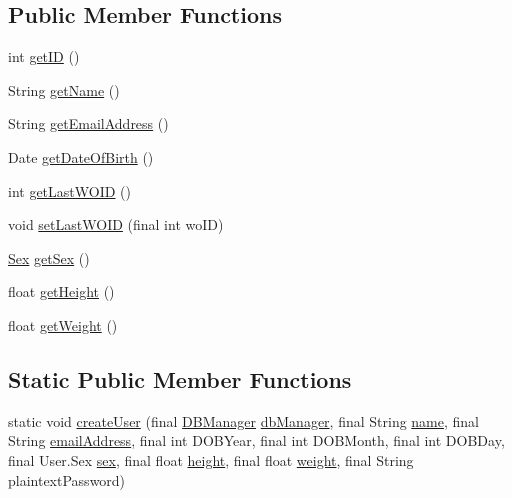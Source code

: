 \subsection*{Public Member Functions}
\begin{DoxyCompactItemize}
\item 
int \mbox{\hyperlink{classcom_1_1activitytracker_1_1_user_a967ae64a7818e9e532ad6d361650d8e6}{get\+ID}} ()
\item 
String \mbox{\hyperlink{classcom_1_1activitytracker_1_1_user_a6b39e49a1e49279035fd61a667d14f64}{get\+Name}} ()
\item 
String \mbox{\hyperlink{classcom_1_1activitytracker_1_1_user_a79d69ca90216e0552ac4cae9778ea40d}{get\+Email\+Address}} ()
\item 
Date \mbox{\hyperlink{classcom_1_1activitytracker_1_1_user_a40da04454cea10bb5c6e6125a7a9cf64}{get\+Date\+Of\+Birth}} ()
\item 
int \mbox{\hyperlink{classcom_1_1activitytracker_1_1_user_a6180e6d835c4b1613f976ed04d68e50e}{get\+Last\+W\+O\+ID}} ()
\item 
void \mbox{\hyperlink{classcom_1_1activitytracker_1_1_user_aae20422e5870c5ba771fb15a5cc6414f}{set\+Last\+W\+O\+ID}} (final int wo\+ID)
\item 
\mbox{\hyperlink{enumcom_1_1activitytracker_1_1_user_1_1_sex}{Sex}} \mbox{\hyperlink{classcom_1_1activitytracker_1_1_user_ac184fdb794730df3fedf3b147283a5fd}{get\+Sex}} ()
\item 
float \mbox{\hyperlink{classcom_1_1activitytracker_1_1_user_a2a80ab659d02a07176b1793354131c00}{get\+Height}} ()
\item 
float \mbox{\hyperlink{classcom_1_1activitytracker_1_1_user_ad15d7b4f96adb6d1a14054bf3eb7e4e0}{get\+Weight}} ()
\end{DoxyCompactItemize}
\subsection*{Static Public Member Functions}
\begin{DoxyCompactItemize}
\item 
static void \mbox{\hyperlink{classcom_1_1activitytracker_1_1_user_ab9d405e0fc6916bbf4836ce6ab762bea}{create\+User}} (final \mbox{\hyperlink{classcom_1_1activitytracker_1_1_d_b_manager}{D\+B\+Manager}} \mbox{\hyperlink{classcom_1_1activitytracker_1_1_user_a8c8b36433447a235f2b4940b92e839c1}{db\+Manager}}, final String \mbox{\hyperlink{classcom_1_1activitytracker_1_1_user_a49bfb4c8ebf8b7a377df01b5f0b2d7bc}{name}}, final String \mbox{\hyperlink{classcom_1_1activitytracker_1_1_user_ac2fdb9a858d0295e52c5f8bc179e3137}{email\+Address}}, final int D\+O\+B\+Year, final int D\+O\+B\+Month, final int D\+O\+B\+Day, final User.\+Sex \mbox{\hyperlink{classcom_1_1activitytracker_1_1_user_adcbddd2e965af4e227f7cf0582a3e13d}{sex}}, final float \mbox{\hyperlink{classcom_1_1activitytracker_1_1_user_a83cdfe6f520a4e18e8710e8e11f8c3d6}{height}}, final float \mbox{\hyperlink{classcom_1_1activitytracker_1_1_user_a8a30c6c08983e513b462bcc035434c9e}{weight}}, final String plaintext\+Password)
\end{DoxyCompactItemize}
